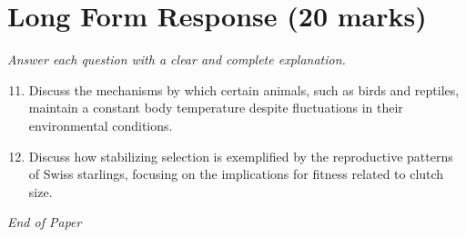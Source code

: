\documentclass[12pt]{article}
\begin{document}
\section*{Long Form Response (20 marks)}
\textit{Answer each question with a clear and complete explanation.}
\begin{enumerate}[label=\arabic*.]
\setcounter{enumi}{10}
\item Discuss the mechanisms by which certain animals, such as birds and reptiles, maintain a constant body temperature despite fluctuations in their environmental conditions.
\item Discuss how stabilizing selection is exemplified by the reproductive patterns of Swiss starlings, focusing on the implications for fitness related to clutch size.
\end{enumerate}

\vfill
\noindent\textit{End of Paper}
\end{document}
